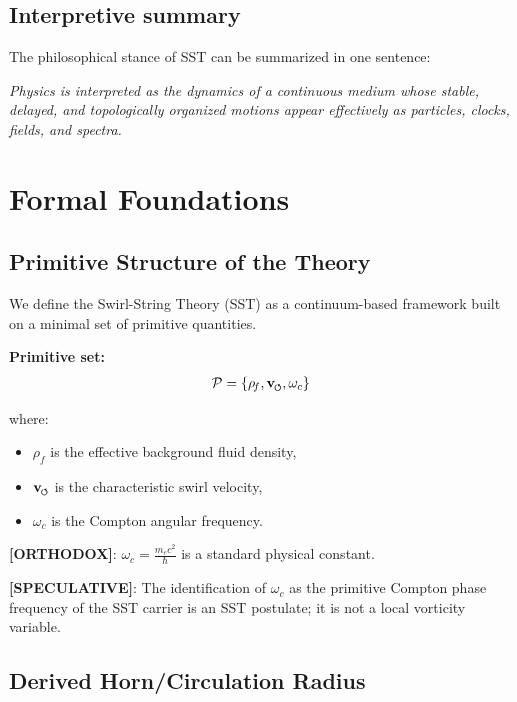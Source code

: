 \documentclass[11pt]{article}
\theoremstyle{definition}
\theoremstyle{plain}
\theoremstyle{remark}
\newcommand{\swirlarrow}{\mathchoice{\mkern-2mu\scriptstyle\boldsymbol{\circlearrowleft}}{\mkern-2mu\scriptstyle\boldsymbol{\circlearrowleft}}{\mkern-2mu\scriptscriptstyle\boldsymbol{\circlearrowleft}}{\mkern-2mu\scriptscriptstyle\boldsymbol{\circlearrowleft}}}
\newcommand{\vswirl}{\mathbf{v}_{\swirlarrow}}
\newcommand{\rhoF}{{\rho_{\!f}}}
\begin{document}
    \subsection{Interpretive summary}
        The philosophical stance of SST can be summarized in one sentence:
        \begin{center}
            \textit{Physics is interpreted as the dynamics of a continuous medium whose stable, delayed, and topologically organized motions appear effectively as particles, clocks, fields, and spectra.}
        \end{center}

\section{Formal Foundations}
    \label{sec:foundations}
    
    \subsection{Primitive Structure of the Theory}
        
        We define the Swirl-String Theory (SST) as a continuum-based framework built on a minimal set of primitive quantities.
        
        \textbf{Primitive set:}
        \begin{align}
            \mathcal{P} = \{ \rhoF, \vswirl, \omega_c \}
        \end{align}
        
        where:
        \begin{itemize}
            \item $\rhoF$ is the effective background fluid density,
            \item $\vswirl$ is the characteristic swirl velocity,
            \item $\omega_c$ is the Compton angular frequency.
        \end{itemize}
        
        \textbf{[ORTHODOX]}: $\omega_c = \frac{m_e c^2}{\hbar}$ is a standard physical constant.
        
        \textbf{[SPECULATIVE]}: The identification of $\omega_c$ as the primitive Compton phase frequency of the SST carrier is an SST postulate; it is not a local vorticity variable.
    
    \subsection{Derived Horn/Circulation Radius}
        \label{subsec:derived_horn_circulation_radius}
\end{document}
